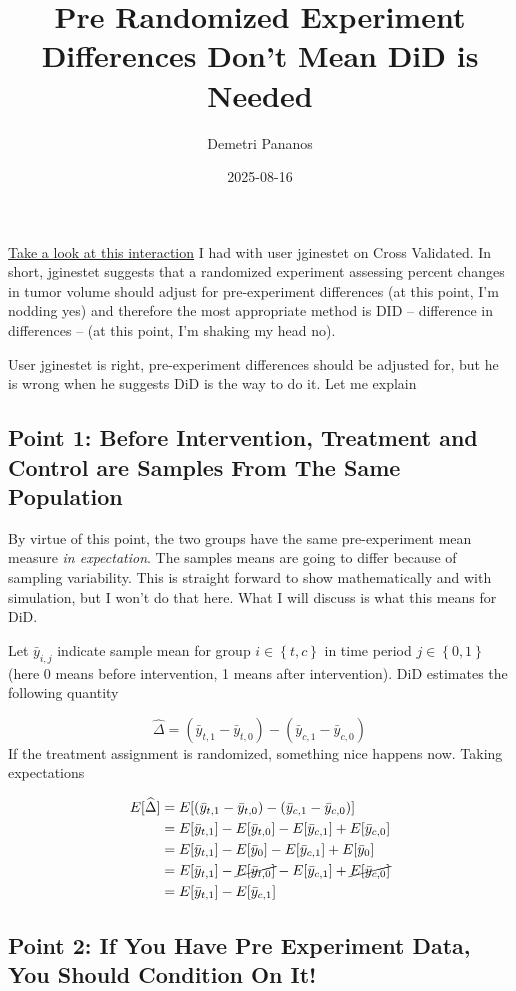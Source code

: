 \documentclass[
  letterpaper,
  DIV=11,
  numbers=noendperiod]{scrartcl}
\title{Pre Randomized Experiment Differences Don't Mean DiD is Needed}
\author{Demetri Pananos}
\date{2025-08-16}
\renewcommand*\contentsname{Table of contents}
\newcommand\contentsname{Table of contents}
\begin{document}
\maketitle

\renewcommand*\contentsname{Sections}
{
\hypersetup{linkcolor=}
\setcounter{tocdepth}{3}
\tableofcontents
}
\href{https://stats.stackexchange.com/a/669596/111259}{Take a look at
this interaction} I had with user jginestet on Cross Validated. In
short, jginestet suggests that a randomized experiment assessing percent
changes in tumor volume should adjust for pre-experiment differences (at
this point, I'm nodding yes) and therefore the most appropriate method
is DID -- difference in differences -- (at this point, I'm shaking my
head no).

User jginestet is right, pre-experiment differences should be adjusted
for, but he is wrong when he suggests DiD is the way to do it. Let me
explain

\subsection{Point 1: Before Intervention, Treatment and Control are
Samples From The Same
Population}\label{point-1-before-intervention-treatment-and-control-are-samples-from-the-same-population}

By virtue of this point, the two groups have the same pre-experiment
mean measure \emph{in expectation}. The samples means are going to
differ because of sampling variability. This is straight forward to show
mathematically and with simulation, but I won't do that here. What I
will discuss is what this means for DiD.

Let \(\bar{y}_{i, j}\) indicate sample mean for group
\(i \in \left\{ t, c \right\}\) in time period
\(j \in \left\{ 0, 1 \right\}\) (here 0 means before intervention, 1
means after intervention). DiD estimates the following quantity

\[ \widehat{\Delta} = (\bar{y}_{t, 1} - \bar{y}_{t, 0}) - (\bar{y}_{c, 1} - \bar{y}_{c, 0})  \]
If the treatment assignment is randomized, something nice happens now.
Taking expectations

\[ \begin{align} E[\widehat{\Delta}] &= E[(\bar{y}_{t, 1} - \bar{y}_{t, 0}) - (\bar{y}_{c, 1} - \bar{y}_{c, 0})] \\ 
&= E[\bar{y}_{t, 1}] - E[\bar{y}_{t, 0}] - E[\bar{y}_{c, 1}] + E[\bar{y}_{c, 0}] \\ 
&= E[\bar{y}_{t, 1}] - E[\bar{y}_{0}] - E[\bar{y}_{c, 1}] + E[\bar{y}_{0}]\\
&= E[\bar{y}_{t, 1}] - \cancel{E[\bar{y}_{t, 0}]} - E[\bar{y}_{c, 1}] + \cancel{E[\bar{y}_{c, 0}]} \\
&= E[\bar{y}_{t, 1}] - E[\bar{y}_{c, 1}]
\end{align}\]

\subsection{Point 2: If You Have Pre Experiment Data, You Should
Condition On
It!}\label{point-2-if-you-have-pre-experiment-data-you-should-condition-on-it}
\end{document}
